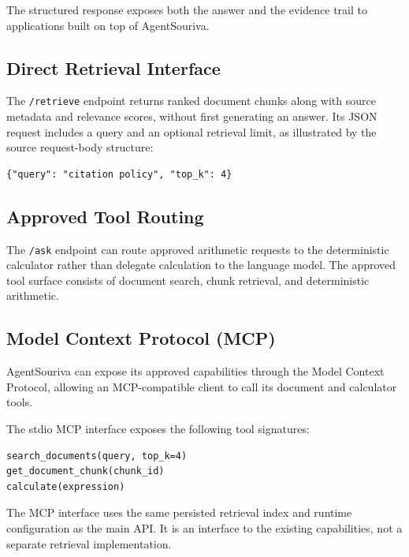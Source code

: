 The structured response exposes both the answer and the evidence trail to applications built on top of AgentSouriva.

\subsection{Direct Retrieval Interface}

The \texttt{/retrieve} endpoint returns ranked document chunks along with source metadata and relevance scores, without first generating an answer. Its JSON request includes a query and an optional retrieval limit, as illustrated by the source request-body structure:

\begin{verbatim}
{"query": "citation policy", "top_k": 4}
\end{verbatim}

\subsection{Approved Tool Routing}

The \texttt{/ask} endpoint can route approved arithmetic requests to the deterministic calculator rather than delegate calculation to the language model. The approved tool surface consists of document search, chunk retrieval, and deterministic arithmetic.

\subsection{Model Context Protocol (MCP)}

AgentSouriva can expose its approved capabilities through the Model Context Protocol, allowing an MCP-compatible client to call its document and calculator tools.

The stdio MCP interface exposes the following tool signatures:

\begin{verbatim}
search_documents(query, top_k=4)
get_document_chunk(chunk_id)
calculate(expression)
\end{verbatim}

The MCP interface uses the same persisted retrieval index and runtime configuration as the main API. It is an interface to the existing capabilities, not a separate retrieval implementation.


